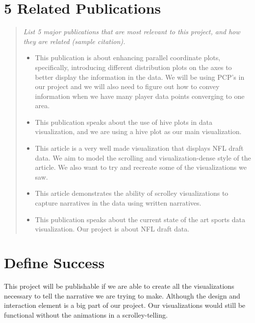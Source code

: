 \documentclass{proc}
\begin{document}
\section{5 Related Publications}
\begin{quote}
\textit{List 5 major publications that are most relevant to this project, and how they are related (sample citation).}
\begin{itemize}
    \item \cite{janetzko2016enhancing} This publication is about enhancing parallel coordinate plots, specifically, introducing different distribution plots on the  axes to better display the information in the data. We will be using PCP's in our project and we will also need to figure out how to convey information when we have many player data points converging to one area.
    \item \cite{krzywinski2012hive} This publication speaks about the use of hive plots in data visualization, and we are using a hive plot as our main visualization. 
    \item \cite{meko2016legendary} This article is a very well made visualization that displays NFL draft data. We aim to model the scrolling and visualization-dense style of the article. We also want to try and recreate some of the visualizations we saw.
    \item \cite{morth2023scrollyvis}This article demonstrates the ability of scrolley visualizations to capture narratives in the data using written narratives.
    \item \cite{perin2018state} This publication speaks about the current state of the art sports data visualization. Our project is about NFL draft data.
\end{itemize}
\end{quote}

\section{Define Success}
This project will be publishable if we are able to create all the visualizations necessary to tell the narrative we are trying to make. Although the design and interaction element is a big part of our project. Our visualizations would still be functional without the animations in a scrolley-telling. 



\end{document}
